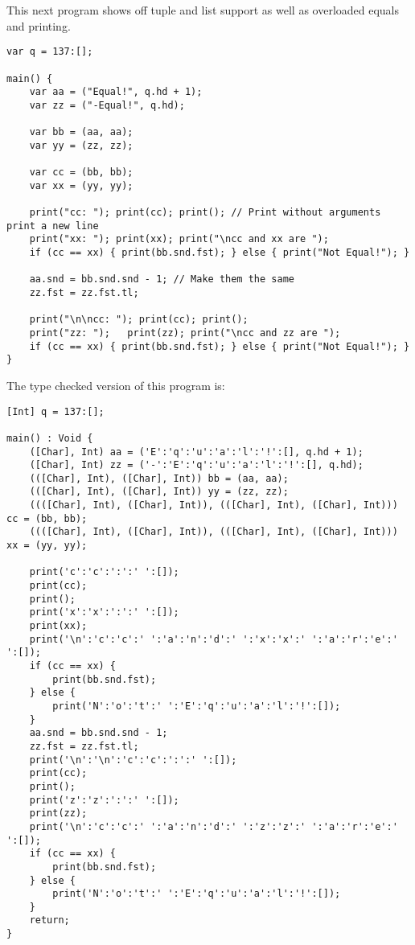 \documentclass{report}
\begin{document}
\noindent This next program shows off tuple and list support as well as overloaded equals and printing.

\begin{lstlisting}[style=SPL]
var q = 137:[];

main() {
    var aa = ("Equal!", q.hd + 1);
    var zz = ("-Equal!", q.hd);
    
    var bb = (aa, aa);
    var yy = (zz, zz);
    
    var cc = (bb, bb);
    var xx = (yy, yy);

    print("cc: "); print(cc); print(); // Print without arguments print a new line
    print("xx: "); print(xx); print("\ncc and xx are ");
    if (cc == xx) { print(bb.snd.fst); } else { print("Not Equal!"); }

    aa.snd = bb.snd.snd - 1; // Make them the same
    zz.fst = zz.fst.tl; 

    print("\n\ncc: "); print(cc); print(); 
    print("zz: ");   print(zz); print("\ncc and zz are ");
    if (cc == xx) { print(bb.snd.fst); } else { print("Not Equal!"); }
}
\end{lstlisting}

\noindent The type checked version of this program is:

\begin{lstlisting}[style=SPL]
[Int] q = 137:[];

main() : Void {
    ([Char], Int) aa = ('E':'q':'u':'a':'l':'!':[], q.hd + 1);
    ([Char], Int) zz = ('-':'E':'q':'u':'a':'l':'!':[], q.hd);
    (([Char], Int), ([Char], Int)) bb = (aa, aa);
    (([Char], Int), ([Char], Int)) yy = (zz, zz);
    ((([Char], Int), ([Char], Int)), (([Char], Int), ([Char], Int))) cc = (bb, bb);
    ((([Char], Int), ([Char], Int)), (([Char], Int), ([Char], Int))) xx = (yy, yy);
    
    print('c':'c':':':' ':[]);
    print(cc);
    print();
    print('x':'x':':':' ':[]);
    print(xx);
    print('\n':'c':'c':' ':'a':'n':'d':' ':'x':'x':' ':'a':'r':'e':' ':[]);
    if (cc == xx) {
        print(bb.snd.fst);
    } else {
        print('N':'o':'t':' ':'E':'q':'u':'a':'l':'!':[]);
    }
    aa.snd = bb.snd.snd - 1;
    zz.fst = zz.fst.tl;
    print('\n':'\n':'c':'c':':':' ':[]);
    print(cc);
    print();
    print('z':'z':':':' ':[]);
    print(zz);
    print('\n':'c':'c':' ':'a':'n':'d':' ':'z':'z':' ':'a':'r':'e':' ':[]);
    if (cc == xx) {
        print(bb.snd.fst);
    } else {
        print('N':'o':'t':' ':'E':'q':'u':'a':'l':'!':[]);
    }
    return;
}
\end{lstlisting}
\end{document}
